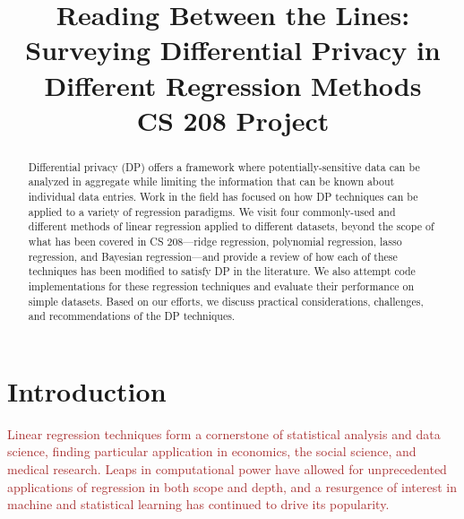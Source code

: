 \documentclass[11pt,conference]{IEEEtran}
\begin{document}
\title{\huge{Reading Between the Lines: Surveying Differential Privacy in Different Regression Methods} \\ \Large{CS 208 Project}}

\author{
\and
{}
}

\maketitle

\begin{abstract}
Differential privacy (DP) offers a framework where potentially-sensitive data can be analyzed in aggregate while limiting the information that can be known about individual data entries. Work in the field has focused on how DP techniques can be applied to a variety of regression paradigms. We visit four commonly-used and different methods of linear regression applied to different datasets, beyond the scope of what has been covered in CS 208---ridge regression, polynomial regression, lasso regression, and Bayesian regression---and provide a review of how each of these techniques has been modified to satisfy DP in the literature. We also attempt code implementations for these regression techniques and evaluate their performance on simple datasets. Based on our efforts, we discuss practical considerations, challenges, and recommendations of the DP techniques.
\end{abstract}

\section{Introduction}
\textcolor{brown}{Linear regression techniques form a cornerstone of statistical analysis and data science, finding particular application in economics, the social science, and medical research. Leaps in computational power have allowed for unprecedented applications of regression in both scope and depth, and a resurgence of interest in machine and statistical learning has continued to drive its popularity.}
\end{document}
